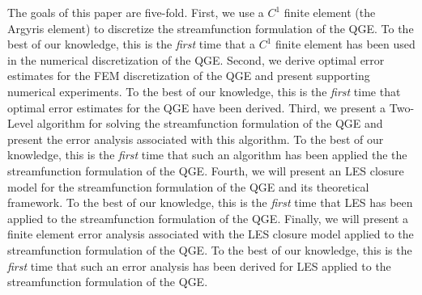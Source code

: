 The goals of this paper are five-fold. First, we use a $C^1$ finite element (the Argyris element)
to discretize the streamfunction formulation of the QGE. To the best of our knowledge, this is the
\emph{first} time that a $C^1$ finite element has been used in the numerical discretization of the
QGE. Second, we derive optimal error estimates for the FEM discretization of the QGE and present
supporting numerical experiments. To the best of our knowledge, this is the \emph{first} time that
optimal error estimates for the QGE have been derived. Third, we present a Two-Level algorithm for
solving the streamfunction formulation of the QGE and present the error analysis associated with
this algorithm. To the best of our knowledge, this is the \emph{first} time that such an algorithm
has been applied the the streamfunction formulation of the QGE. Fourth, we will present an LES
closure model for the streamfunction formulation of the QGE and its theoretical framework. To the
best of our knowledge, this is the \emph{first} time that LES has been applied to the streamfunction
formulation of the QGE. Finally, we will present a finite element error analysis associated with the
LES closure model applied to the streamfunction formulation of the QGE. To the best of our
knowledge, this is the \emph{first} time that such an error analysis has been derived for LES
applied to the streamfunction formulation of the QGE.

